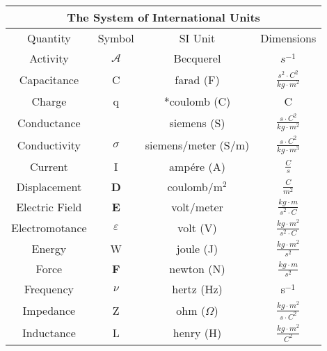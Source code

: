 \begin{table}[h]
  \centering
  \begin{longtable}{c c c c}
    \multicolumn{4}{c}{\Large The System of International Units}\\
    \hline
    Quantity \T\B& Symbol & SI Unit & Dimensions\\  [0.5ex]
    \hline\hline
    Activity   \T & $\mathcal{A}$ & Becquerel     & $s^{-1}$ \\[3pt]

    Capacitance   &  C        & farad  (F)    & $\frac{s^2\cdot C^2}{kg\cdot m^2}$ \\[3pt]
    
    Charge        &  q        & *coulomb (C)  & C \\[3pt]
    
    Conductance   &           & siemens (S)   & $\frac{s\cdot C^2}{kg\cdot m^2}$ \\[3pt]
    
    Conductivity  & $\sigma$  & siemens/meter (S/m)  & $\frac{s\cdot C^2}{kg\cdot m^3}$ \\[3pt]
    
    Current       & I         & amp\'ere (A)   & $\frac{C}{s}$ \\[3pt]    
    
    Displacement    & \textbf{D} & coulomb/m$^2$   &  $\frac{C}{m^2}$ \\[3pt]
    
    Electric Field  & \textbf{E} & volt/meter    & $\frac{kg\cdot m}{s^2\cdot C}$ \\[3pt]
    
    Electromotance  & $\varepsilon$ & volt (V)  & $\frac{kg\cdot  m^2}{s^2\cdot C}$ \\[3pt]
    
    Energy          & W             & joule (J) & $\frac{kg\cdot m^2}{s^2}$ \\[3pt]
    
    Force           & \textbf{F}    & newton (N) & $\frac{kg\cdot m}{s^2}$ \\[3pt]
    
    Frequency       & $\nu$         & hertz (Hz)  & s$^{-1}$ \\[3pt]
    
    Impedance       & Z             & ohm ($\Omega$)  & $\frac{kg\cdot m^2}{s\cdot C^2}$ \\[3pt]
    
    Inductance      & L             & henry (H) & $\frac{kg\cdot m^2}{C^2}$ \\[3pt]
    

\end{longtable}
\end{table}
